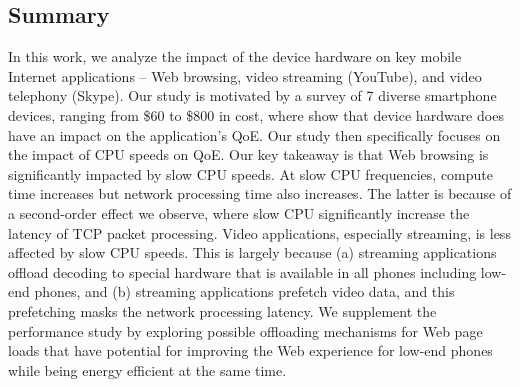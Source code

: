 
\subsection{Summary}

In this work, we analyze the impact of the device hardware on key mobile Internet applications -- Web browsing, video streaming (YouTube), and video telephony (Skype). Our study is motivated by a survey of 7 diverse smartphone devices, ranging from \$60 to \$800 in cost, where show that device hardware does have an impact on 
the application's QoE. Our study then
specifically focuses on the impact of CPU speeds on QoE. Our key takeaway is that Web browsing is significantly impacted by slow CPU speeds. At slow CPU frequencies, compute time increases but  network processing time also increases. The latter is because of a second-order effect we observe, where slow CPU significantly increase the latency of TCP packet processing. Video applications, especially streaming, is less affected by slow CPU speeds. This is largely because (a) streaming applications offload decoding to special hardware that is available in all phones including low-end phones, and (b) streaming applications prefetch video data, and this prefetching masks the network processing latency. We supplement the performance study by exploring
possible offloading mechanisms for Web page loads that 
have potential for improving the Web experience for low-end phones while being
energy efficient at the same time. 


%
%
